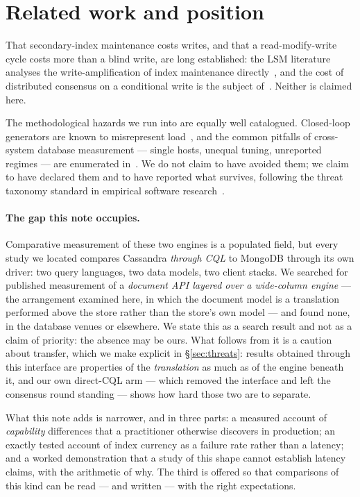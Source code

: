 \documentclass[11pt,a4paper]{article}
\begin{document}
\section{Related work and position}

That secondary-index maintenance costs writes, and that a read-modify-write cycle costs more than a
blind write, are long established: the LSM literature analyses the write-amplification of index
maintenance directly~\cite{oneil1996lsm,luo2019lsmsurvey}, and the cost of distributed consensus on a
conditional write is the subject of~\cite{lamport1998parttime}. Neither is claimed here.

The methodological hazards we run into are equally well catalogued. Closed-loop generators are known
to misrepresent load~\cite{schroeder2006openclosed}, and the common pitfalls of cross-system database
measurement --- single hosts, unequal tuning, unreported regimes --- are enumerated
in~\cite{raasveldt2018fair}. We do not claim to have avoided them; we claim to have declared them and
to have reported what survives, following the threat taxonomy standard in empirical software
research~\cite{wohlin2012experimentation}.

\paragraph{The gap this note occupies.} Comparative measurement of these two engines is a populated
field, but every study we located compares Cassandra \emph{through CQL} to MongoDB through its own
driver: two query languages, two data models, two client stacks. We searched for published
measurement of a \emph{document API layered over a wide-column engine} --- the arrangement examined
here, in which the document model is a translation performed above the store rather than the store's
own model --- and found none, in the database venues or elsewhere. We state this as a search result
and not as a claim of priority: the absence may be ours. What follows from it is a caution about
transfer, which we make explicit in \S\ref{sec:threats}: results obtained through this interface are
properties of the \emph{translation} as much as of the engine beneath it, and our own direct-CQL arm
--- which removed the interface and left the consensus round standing --- shows how hard those two
are to separate.

What this note adds is narrower, and in three parts: a measured account of \emph{capability}
differences that a practitioner otherwise discovers in production; an exactly tested account of index
currency as a failure rate rather than a latency; and a worked demonstration that a study of this
shape cannot establish latency claims, with the arithmetic of why. The third is offered so that
comparisons of this kind can be read --- and written --- with the right expectations.
\end{document}
